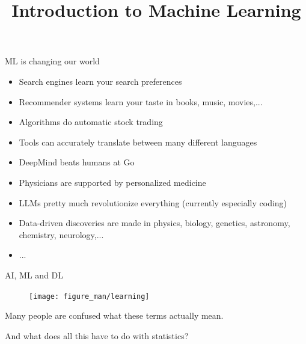 \documentclass[11pt,compress,t,notes=noshow, xcolor=table]{beamer}
\title{Introduction to Machine Learning}
\begin{document}


\begin{frame}{ML is changing our world}

\begin{itemize}

  \item Search engines learn your search preferences
  
  \item Recommender systems learn your taste in books, music, movies,...
  
  \item Algorithms do automatic stock trading
 

  \item Tools can accurately translate between many different languages
    
  \item DeepMind beats humans at Go
  
  \item Physicians are supported by personalized medicine

  \item LLMs pretty much revolutionize everything (currently especially coding)
  
  \item Data-driven discoveries are made in physics, biology, genetics, 
  astronomy, chemistry, neurology,...
  
  \item ...
  
\end{itemize}

\end{frame}


\begin{frame}{AI, ML and DL}

\begin{center}

  \begin{figure}
    \texttt{[image: figure\_man/learning]} 
  \end{figure}
  \end{center}
  \lz

Many people are confused what these terms actually mean. 

\lz

And what does all this have to do with statistics?

  
\end{frame}
\end{document}

